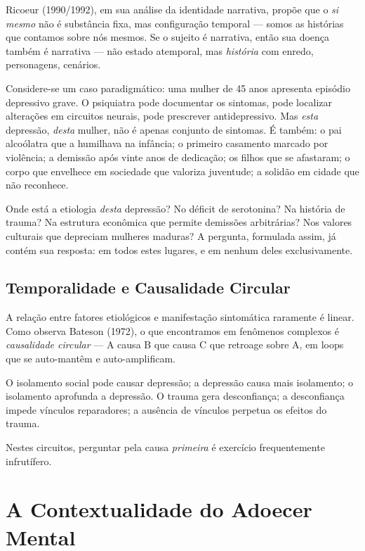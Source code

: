 Ricoeur (1990/1992), em sua análise da identidade narrativa, propõe que o \textit{si mesmo} não é substância fixa, mas configuração temporal --- somos as histórias que contamos sobre nós mesmos. Se o sujeito é narrativa, então sua doença também é narrativa --- não estado atemporal, mas \textit{história} com enredo, personagens, cenários.

Considere-se um caso paradigmático: uma mulher de 45 anos apresenta episódio depressivo grave. O psiquiatra pode documentar os sintomas, pode localizar alterações em circuitos neurais, pode prescrever antidepressivo. Mas \textit{esta} depressão, \textit{desta} mulher, não é apenas conjunto de sintomas. É também: o pai alcoólatra que a humilhava na infância; o primeiro casamento marcado por violência; a demissão após vinte anos de dedicação; os filhos que se afastaram; o corpo que envelhece em sociedade que valoriza juventude; a solidão em cidade que não reconhece.

Onde está a etiologia \textit{desta} depressão? No déficit de serotonina? Na história de trauma? Na estrutura econômica que permite demissões arbitrárias? Nos valores culturais que depreciam mulheres maduras? A pergunta, formulada assim, já contém sua resposta: em todos estes lugares, e em nenhum deles exclusivamente.

\subsection{Temporalidade e Causalidade Circular}

A relação entre fatores etiológicos e manifestação sintomática raramente é linear. Como observa Bateson (1972), o que encontramos em fenômenos complexos é \textit{causalidade circular} --- A causa B que causa C que retroage sobre A, em loops que se auto-mantêm e auto-amplificam.

O isolamento social pode causar depressão; a depressão causa mais isolamento; o isolamento aprofunda a depressão. O trauma gera desconfiança; a desconfiança impede vínculos reparadores; a ausência de vínculos perpetua os efeitos do trauma.

Nestes circuitos, perguntar pela causa \textit{primeira} é exercício frequentemente infrutífero.

\section{A Contextualidade do Adoecer Mental}
\label{sec:contextualidade}

